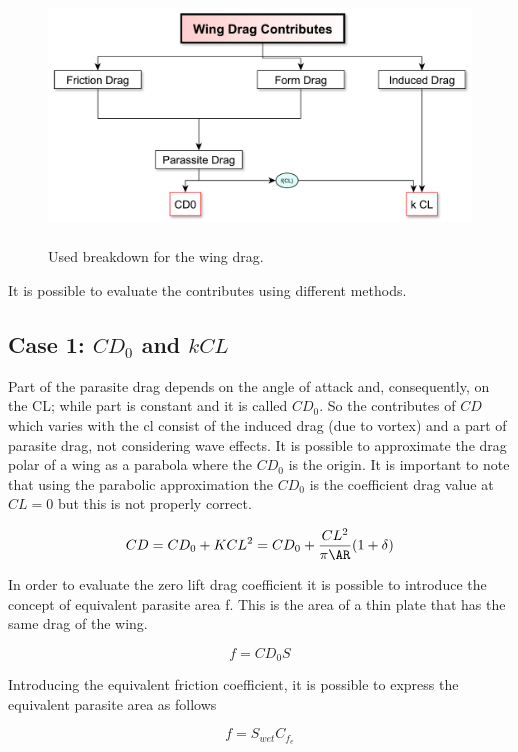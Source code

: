 \begin{figure}[H]
	\centering
	{\includegraphics[height=6cm]{Immagini/dragfactors.pdf}} 
	\caption{Used breakdown for the wing drag.}
	\label{newcomponent}
\end{figure}

It is possible to evaluate the contributes using different methods.

\subsection{Case 1:  $CD_0$  and $k CL$}
Part of the parasite drag depends on the angle of attack and, consequently, on the CL; while part is constant and it is called $CD_0$. So the contributes of $CD$ which varies with the cl consist of the induced drag (due to vortex) and a part of parasite drag, not considering wave effects. It is possible to approximate the drag polar of a wing as a parabola where the $CD_0$ is the origin. It is important to note that using the parabolic approximation the $CD_0$ is the coefficient drag value at $CL=0$ but this is not properly correct.

\begin{equation}
CD = CD_0 + KCL^2 = CD_0 + \frac{CL^2}{\pi \AR}(1+\delta)
\end{equation}

In order to evaluate the zero lift drag coefficient it is possible to introduce the concept of equivalent parasite area f. This is the area of a thin plate that has the same drag of the wing.

\begin{equation}
f = CD_0 S
\label{cd01}
\end{equation}

Introducing the equivalent friction coefficient, it is possible to express the equivalent parasite area as follows

\begin{equation}
f= S_{wet} C_{f_{e}}
\label{cd02}
\end{equation}

